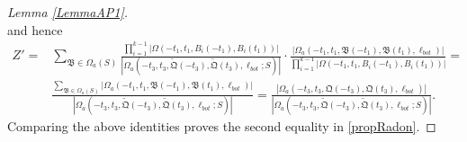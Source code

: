 \begin{proof}[Lemma \ref{LemmaAP1}]
\[	\]
	and hence
	\begin{equation*}
		\begin{split}
			Z' =&\sum_{\mathfrak{B}\in \Omega_a(S)}\frac{\prod_{i = 1}^{k-1}|\Omega(-t_1,t_1,B_i(-t_1),B_i(t_1))|}{|\Omega_a(-t_3,t_3,\tilde{\mathfrak{Q}}(-t_3),\tilde{\mathfrak{Q}}(t_3),\ell_{bot};S)|}\cdot\frac{|\Omega_a(-t_1,t_1,\mathfrak B(-t_1),\mathfrak{B}(t_1),\ell_{bot})|}{\prod_{i = 1}^{k-1}|\Omega(-t_1,t_1, B_i(-t_1),B_i(t_1))|}=\\ 
			&\frac{\sum_{\mathfrak{B}\in\Omega_a(S)}|\Omega_a(-t_1,t_1,\mathfrak B(-t_1),\mathfrak B(t_1),\ell_{bot})|}{|\Omega_a(-t_3,t_3,\tilde{\mathfrak{Q}}(-t_3),\tilde{\mathfrak{Q}}(t_3),\ell_{bot};S)|} = \frac{|\Omega_a(-t_3,t_3,{\mathfrak{Q}}(-t_3),{\mathfrak{Q}}(t_3),\ell_{bot})|}{|\Omega_a(-t_3,t_3,\tilde{\mathfrak{Q}}(-t_3),\tilde{\mathfrak{Q}}(t_3),\ell_{bot};S)|}.
		\end{split}
	\end{equation*}
	Comparing the above identities proves the second equality in \eqref{propRadon}.
	

\end{proof}
